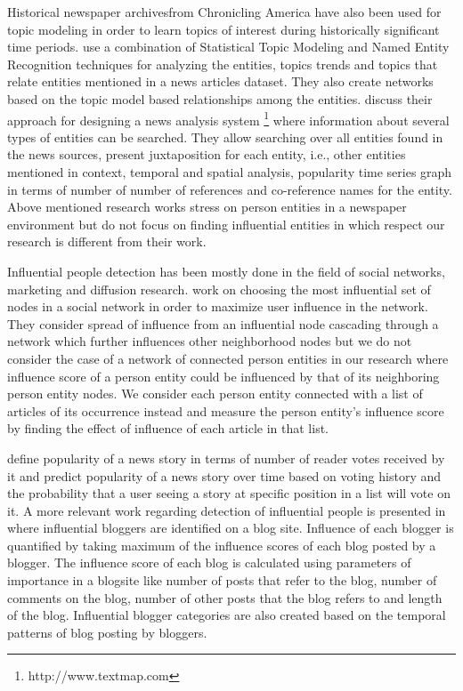 Historical newspaper archivesfrom Chronicling America have also been used for topic modeling in order to learn topics of interest during historically significant time periods\cite{yang2011topic}. \cite{newman2006analyzing} use a combination of Statistical Topic Modeling and Named Entity Recognition techniques for analyzing the entities, topics trends and topics that relate entities mentioned in a news articles dataset. They also create networks based on the topic model based relationships among the entities.
\cite{lloyd2005lydia} discuss their approach for designing a news analysis system \footnote{http://www.textmap.com} where information about several types of entities can be searched. They allow searching over all entities found in the news sources, present juxtaposition for each entity, i.e., other entities mentioned in context, temporal and spatial analysis, popularity time series graph in terms of number of number of references and co-reference names for the entity.
 Above mentioned research works stress on person entities in a newspaper environment but do not focus on finding influential entities in which respect our research is different from their work.

Influential people detection has been mostly done in the field of social networks, marketing and diffusion research.
\cite{kempe2003maximizing} work on choosing the most influential set of nodes  in a social network in order to maximize user influence in the network. They consider spread of influence from an influential node cascading through a network which further influences other neighborhood nodes but we do not consider the case of a network of connected person entities in our research where influence score of a person entity could be influenced by that of its neighboring person entity nodes. We consider each person entity connected with a list of articles of its occurrence instead and measure the person entity's influence score by finding the effect of influence of each article in that list.
 

\cite{lerman2010using} define popularity of a news story in terms of number of reader votes received by it and predict popularity of a news story over time based on voting history and the probability that a user seeing a story at specific position in a list will vote on it. 
A more relevant work regarding detection of influential people is presented in \cite{agarwal2008identifying} where influential bloggers are identified on a blog site. Influence of each blogger is quantified by taking maximum of the influence scores of each blog posted by a blogger. The influence score of each blog is calculated using parameters of importance in a blogsite like number of posts that refer to the blog, number of comments on the blog, number of other posts that the blog refers to and length of the blog. Influential blogger categories are also created based on the temporal patterns of blog posting by bloggers. 

